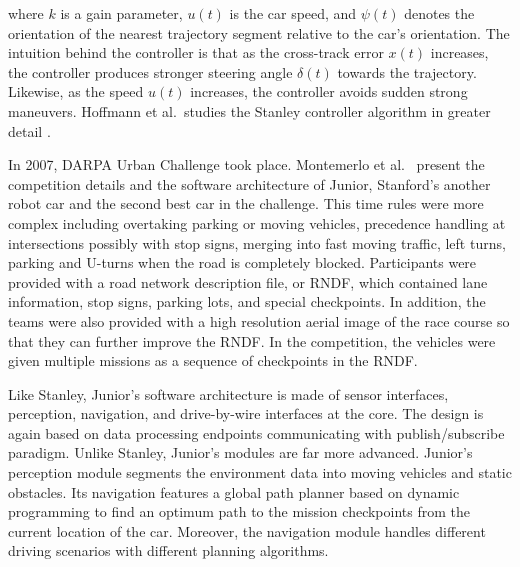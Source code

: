 where $k$ is a gain parameter, $u(t)$ is the car speed, and $\psi(t)$ denotes
the orientation of the nearest trajectory segment relative to the car's
orientation. The intuition behind the controller is that as the cross-track
error $x(t)$ increases, the controller produces stronger steering angle
$\delta(t)$ towards the trajectory. Likewise, as the speed $u(t)$ increases,
the controller avoids sudden strong maneuvers. Hoffmann et al.\ studies the
Stanley controller algorithm in greater detail \cite{Hoffmann2007AutonomousAT}.

In 2007, DARPA Urban Challenge took place. Montemerlo et al.\
\cite{Montemerlo2009JuniorTS} present the competition details and the software
architecture of Junior, Stanford's another robot car and the second best car in
the challenge. This time rules were more complex including overtaking parking
or moving vehicles, precedence handling at intersections possibly with stop
signs, merging into fast moving traffic, left turns, parking and U-turns when
the road is completely blocked. Participants were provided with a road network
description file, or RNDF, which contained lane information, stop signs,
parking lots, and special checkpoints. In addition, the teams were also
provided with a high resolution aerial image of the race course so that they
can further improve the RNDF. In the competition, the vehicles were given
multiple missions as a sequence of checkpoints in the RNDF.

Like Stanley, Junior's software architecture is made of sensor interfaces,
perception, navigation, and drive-by-wire interfaces at the core. The design
is again based on data processing endpoints communicating with
publish/subscribe paradigm. Unlike Stanley, Junior's modules are far more
advanced. Junior's perception module segments the environment data into moving
vehicles and static obstacles. Its navigation features a global path planner
based on dynamic programming to find an optimum path to the mission checkpoints
from the current location of the car. Moreover, the navigation module handles
different driving scenarios with different planning algorithms.

